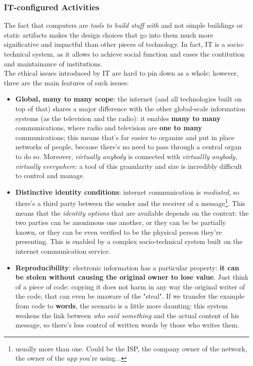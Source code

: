 \documentclass{article}
\begin{document}
		\subsubsection{IT-configured Activities}
			The fact that computers are \textit{tools to build stuff with} and not simple buildings or static artifacts makes the design choices that go into them much more significative and impactful than other pieces of technology. In fact, IT is a socio-technical system, as it allows to achieve social function and eases the contitution and maintainance of institutions.\\
			The ethical issues introduced by IT are hard to pin down as a whole; however, three are the main features of such issues:
			\begin{itemize}
				\item \textbf{Global, many to many scope}: the internet (and all technologies built on top of that) shares a major difference with the other global-scale information systems (as the television and the radio): it enables \textbf{many to many} communications, where radio and television are \textbf{one to many} communications; this means that's far easier to organize and put in place networks of people, because there's no need to pass through a central organ to do so. Moreover, \textit{virtually anybody} is connected with \textit{virtuallly anybody, virtually everywhere}: a tool of this granularity and size is incredibly difficult to control and manage.
				\item \textbf{Distinctive identity conditions}: internet communication is \textit{mediated}, so there's a third party between the sender and the receiver of a message\footnote{usually more than one. Could be the ISP, the company owner of the network, the owner of the \textit{app} you're using...}. This means that the \textit{identity options} that are available depends on the context: the two parties can be anonimous one another, or they can be be partially known, or they can be even verified to be the physical person they're presenting. This is enabled by a complex socio-technical system built on the internet communication service.
				\item \textbf{Reproducibility}: electronic information has a particular property: \textbf{it can be stolen without causing the original owner to lose value}. Just think of a piece of code: copying it does not harm in any way the original writer of the code, that can even be unaware of the "steal". If we transfer the example from code to \textbf{words}, the scenario is a little more daunting: this system weakens the link between \textit{who said something} and the actual content of his message, so there's less control of written words by those who writes them.
			\end{itemize}
\end{document}
